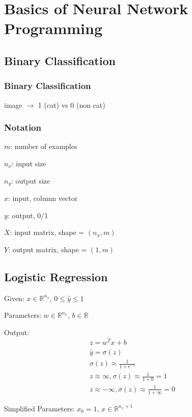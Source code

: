 \newpage{}
\section{Basics of Neural Network Programming}


\subsection{Binary Classification}
\subsubsection{Binary Classification}
image $\rightarrow$ 1 (cat) vs 0 (non cat)

\subsubsection{Notation}
	$m$: number of examples

	$n_x$: input size

	$n_y$: output size

	$x$: input, column vector

	$y$: output, 0/1

	$X$: input matrix, shape = $(n_x, m)$

	$Y$: output matrix, shape = $(1, m)$



\subsection{Logistic Regression}
Given:
	$x \in \mathbb{R}^{n_x}$, $0 \le \hat{y} \le 1$

Parameters: 
	$w \in \mathbb{R}^{n_x}$, $b \in \mathbb{R}$

Output: 
\begin{align}
	z = w^Tx + b   \\
	\hat{y} = \sigma{(z)} \\
	\sigma{(z)} \approx \frac{1}{1 + e^{-z}} \\
	z \approx \infty, \sigma{(z)} \approx \frac{1}{1 + 0} = 1 \\
	z \approx -\infty, \sigma{(z)} \approx \frac{1}{1 + \infty} = 0
\end{align}

Simplified Parameters:
	$x_0 = 1$, $x \in \mathbb{R}^{{n_x} + 1}$

